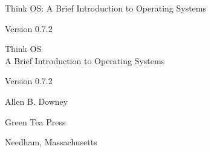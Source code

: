\documentclass[12pt]{book}
\newcommand{\theversion}{0.7.2}
\begin{document}
\begin{latexonly}

\renewcommand{\blankpage}{\thispagestyle{empty} \quad \newpage}



\thispagestyle{empty}

\begin{flushright}
\vspace*{2.0in}

\begin{spacing}{3}
{\huge Think OS: A Brief Introduction to Operating Systems}\\
{\Large }
\end{spacing}

\vspace{0.25in}

Version \theversion

\vfill

\end{flushright}


\blankpage
\blankpage

\pagebreak
\thispagestyle{empty}

\begin{flushright}
\vspace*{2.0in}

\begin{spacing}{3}
{\huge Think OS}\\
{\Large  A Brief Introduction to Operating Systems}
\end{spacing}

\vspace{0.25in}

Version \theversion

\vspace{1in}


{\Large
Allen B. Downey\\
}


\vspace{0.5in}

{\Large Green Tea Press}

{\small Needham, Massachusetts}


\end{flushright}
\end{latexonly}
\end{document}
